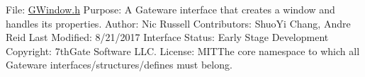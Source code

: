 File\+: \mbox{\hyperlink{GWindow_8h_source}{G\+Window.\+h}} Purpose\+: A Gateware interface that creates a window and handles its properties. Author\+: Nic Russell Contributors\+: Shuo\+Yi Chang, Andre Reid Last Modified\+: 8/21/2017 Interface Status\+: Early Stage Development Copyright\+: 7th\+Gate Software L\+LC. License\+: M\+I\+T\+The core namespace to which all Gateware interfaces/structures/defines must belong. 